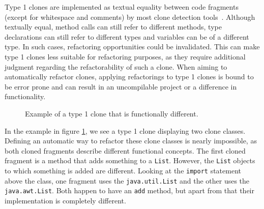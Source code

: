 Type 1 clones are implemented as textual equality between code fragments (except for whitespace and comments) by most clone detection tools~\cite{kamiya2002ccfinder, semura2017ccfindersw, roy2008nicad, svajlenko2016bigcloneeval, svajlenko2014evaluating}. Although textually equal, method calls can still refer to different methods, type declarations can still refer to different types and variables can be of a different type. In such cases, refactoring opportunities could be invalidated. This can make type 1 clones less suitable for refactoring purposes, as they require additional judgment regarding the refactorability of such a clone. When aiming to automatically refactor clones, applying refactorings to type 1 clones is bound to be error prone and can result in an uncompilable project or a difference in functionality.

\begin{figure}[H]
\begin{parcolumns}{2}
\end{parcolumns}
\caption{Example of a type 1 clone that is functionally different.}
\label{fig:type1}
\end{figure}

In the example in figure \ref{fig:type1}, we see a type 1 clone displaying two clone classes. Defining an automatic way to refactor these clone classes is nearly impossible, as both cloned fragments describe different functional concepts. The first cloned fragment is a method that adds something to a \texttt{List}. However, the \texttt{List} objects to which something is added are different. Looking at the \texttt{import} statement above the class, one fragment uses the \texttt{java.util.List} and the other uses the \texttt{java.awt.List}. Both happen to have an \texttt{add} method, but apart from that their implementation is completely different.

